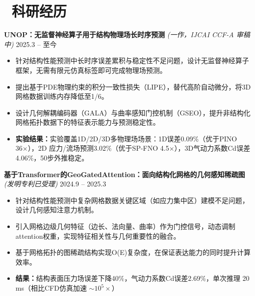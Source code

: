 \documentclass[11pt]{article}
\newlength{\interProjectSpacing}
\newcommand{\projectsep}{\vspace{\interProjectSpacing}}
\begin{document}
\section{\makebox[\widthof{\faUsers}][c]{\color{CVBlue}\faUsers}\ 
科研经历}

\textbf{UNOP：无监督神经算子用于结构物理场长时序预测} 
\textit{(一作，IJCAI CCF-A 审稿中)} 
\hfill 2025.3 -- 至今
\begin{itemize}
    \item 针对结构性能预测中长时序误差累积与稳定性不足问题，设计无监督神经算子框架，无需有限元仿真标签即可完成物理场预测。
    
    \item 提出基于PDE物理约束的积分一致性损失（LIPE），替代高阶自动微分，将3D网格数据训练内存降低至1/6。
    
    \item 设计几何解耦编码器（GALA）与曲率感知门控机制（GSEO），提升非结构化网格拓扑数据下的特征表示能力与预测稳定性。
    
    \item \textbf{实验结果：}实验覆盖1D/2D/3D多物理场场景：1D误差0.09\%（优于PINO 36×），2D 应力/流场预测3.02\%（优于SP-FNO 4.5×），3D气动力系数Cd误差4.06\%，50步外推稳定。
\end{itemize}


\textbf{基于Transformer的GeoGatedAttention：面向结构化网格的几何感知稀疏图} 
\textit{(发明专利已受理)} \hfill 2024.9 -- 2025.3
\begin{itemize}
    \item 针对结构性能预测中复杂网格数据关键区域（如应力集中区）建模不足问题，设计几何感知注意力机制。
    \item 引入网格边级几何特征（边长、法向量、曲率）作为门控信号，动态调制attention权重，实现特征相关性与几何重要性的融合。
    \item 基于网格拓扑的图稀疏结构实现O(E)复杂度，在保证表达能力的同时提升计算效率。
    \item \textbf{结果：}结构表面压力场误差下降40\%，气动力系数Cd误差2.69\%，单次推理 20 ms（相比CFD仿真加速 $\sim 10^5 \times$）
\end{itemize}

\end{document}

